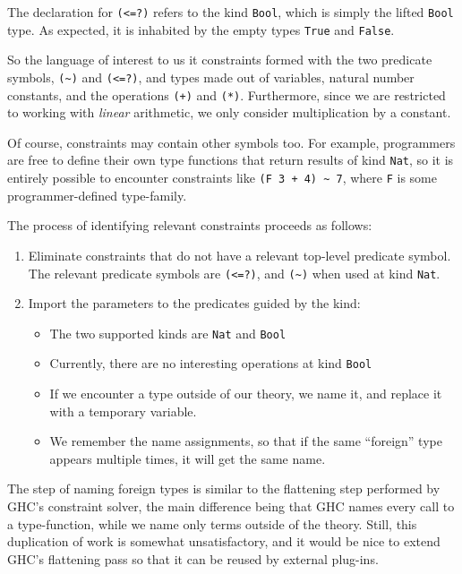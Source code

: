 \documentclass{sigplanconf}
\begin{document}
The declaration for \Verb"(<=?)" refers to the kind \Verb"Bool", which
is simply the lifted \Verb"Bool" type.  As expected, it is inhabited by the
empty types \Verb"True" and \Verb"False".

So the language of interest to us it constraints formed with the two
predicate symbols, \Verb"(~)" and \Verb"(<=?)", and types made out
of variables, natural number constants, and the operations \Verb"(+)" and
\Verb"(*)".  Furthermore, since we are restricted to working with {\em linear}
arithmetic, we only consider multiplication by a constant.

Of course, constraints may contain other symbols too.  For example,
programmers are free to define their own type functions that return
results of kind \Verb"Nat", so it is entirely possible to encounter
constraints like \Verb"(F 3 + 4) ~ 7", where \Verb"F" is some programmer-defined
type-family.

The process of identifying relevant constraints proceeds as follows:
\begin{enumerate}
\item Eliminate constraints that do not have a relevant top-level predicate
symbol.  The relevant predicate symbols are \Verb"(<=?)", and \Verb"(~)" when
used at kind \Verb"Nat".
\item Import the parameters to the predicates guided by the kind:
  \begin{itemize}
  \item The two supported kinds are \Verb"Nat" and \Verb"Bool"
  \item Currently, there are no interesting operations at kind \Verb"Bool"
  \item If we encounter a type outside of our theory, we name it, and replace
        it with a temporary variable.
  \item We remember the name assignments, so that if the same ``foreign'' type
        appears multiple times, it will get the same name.
  \end{itemize}
\end{enumerate}

The step of naming foreign types is similar to the flattening step performed
by GHC's constraint solver, the main difference being that GHC names every
call to a type-function, while we name only terms outside of the theory.
Still, this duplication of work is somewhat unsatisfactory, and it would
be nice to extend GHC's flattening pass so that it can be reused by
external plug-ins.
\end{document}
